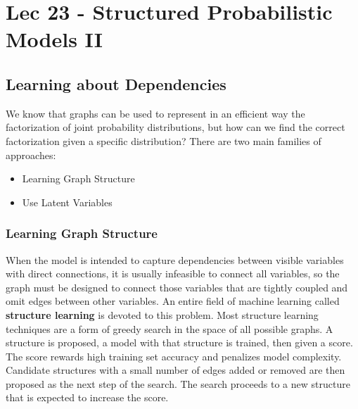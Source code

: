 \chapter{Lec 23 - Structured Probabilistic Models II}

\section{Learning about Dependencies}
We know that graphs can be used to represent in an efficient way the factorization of joint probability distributions, but how can we find the correct factorization given a specific distribution? There are two main families of approaches:
\begin{itemize}
    \item Learning Graph Structure
    \item Use Latent Variables
\end{itemize}

\subsection{Learning Graph Structure}
When the model is intended to capture dependencies between visible variables
with direct connections, it is usually infeasible to connect all variables, so the graph must be designed to connect those variables that are tightly coupled and omit edges between other variables. An entire field of machine learning called \textbf{structure learning} is devoted to this problem.\newline\newline
Most structure learning techniques are a form of greedy search in the space of all possible graphs. A structure is proposed, a model with that structure
is trained, then given a score. The score rewards high training set accuracy and penalizes model complexity. Candidate structures with a small number of edges added or removed are then proposed as the next step of the search. The search proceeds to a new structure that is expected to increase the score.

